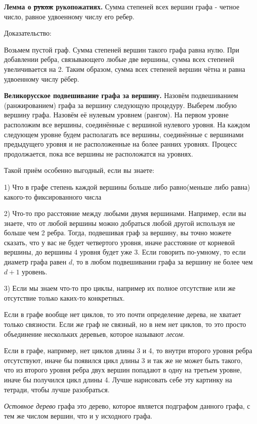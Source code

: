 \textbf{Лемма о \sout{рукож} рукопожатиях.} Сумма степеней всех вершин графа - четное число, равное удвоенному числу его ребер.

Доказательство:

Возьмем пустой граф. Сумма степеней вершин такого графа равна нулю. При добавлении ребра, связывающего любые две вершины, сумма всех степеней увеличивается на 2. Таким образом, сумма всех степеней вершин чётна и равна удвоенному числу рёбер.

\textbf{Великорусское подвешивание графа за вершину.} Назовём подвешиванием (ранжированием) графа за вершину следующую процедуру. Выберем любую вершину графа. Назовём её нулевым уровнем (рангом). На первом уровне расположим все вершины, соединённые с вершиной нулевого уровня. На каждом следующем уровне будем располагать все вершины, соединённые с вершинами предыдущего уровня и не расположенные на более ранних уровнях. Процесс продолжается, пока все вершины не расположатся на уровнях.

Такой приём особенно выгодный, если вы знаете:

1) Что в графе степень каждой вершины больше либо равно(меньше либо равна) какого-то фиксированного числа

2) Что-то про расстояние между любыми двумя вершинами. Например, если вы знаете, что от любой вершины можно добраться любой другой используя не больше чем 2 ребра. Тогда, подвешивая граф за вершину, вы точно можете сказать, что у вас не будет четвертого уровня, иначе расстояние от корневой вершины, до вершины 4 уровня будет уже 3. Если говорить по-умному, то если диаметр графа равен $d$, то в любом подвешивании графа за вершину не более чем $d+1$ уровень.

3) Если мы знаем что-то про циклы, например их полное отсутствие или же отсутствие только каких-то конкретных.

Если в графе вообще нет циклов, то это почти определение дерева, не хватает только связности. Если же граф не связный, но в нем нет циклов, то это просто объединение нескольких деревьев, которое называют \textit{лесом}.

Если в графе, например, нет циклов длины 3 и 4, то внутри второго уровня ребра отсутствуют, иначе бы появился цикл длины 3 и так же не может быть такого, что из второго уровня ребра двух вершин попадают в одну на третьем уровне, иначе бы получился цикл длины 4. Лучше нарисовать себе эту картинку на тетради, чтобы лучше разобраться.

\textit{Остовное дерево} графа это дерево, которое является подграфом данного графа, с тем же числом вершин, что и у исходного графа.

